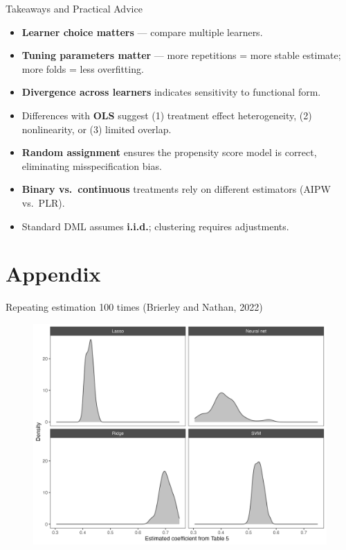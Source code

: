 \documentclass[10pt,table,aspectratio=169]{beamer}
\begin{document}
\begin{frame}[plain, label = two_dimensions]{Takeaways and Practical Advice}

\begin{itemize}
  \item \alert{\bf Learner choice matters} --- compare multiple learners.  \medskip \pause
    \item \alert{\bf Tuning parameters matter} --- more repetitions = more stable estimate; more folds = less overfitting.  \medskip \pause
  \item \alert{\bf Divergence across learners} indicates sensitivity to functional form.   \medskip \pause
  \item Differences with \alert{\bf OLS} suggest (1) \alert{treatment effect heterogeneity}, (2) \alert{nonlinearity}, or (3) \alert{limited overlap}.  \medskip \pause
  \item \alert{\bf Random assignment} ensures the propensity score model is correct, eliminating \alert{misspecification bias}. \medskip \pause
  \item \alert{\bf Binary vs.\ continuous} treatments rely on different estimators (\alert{AIPW} vs.\ \alert{PLR}).  \medskip \pause
  \item Standard DML assumes \alert{\bf i.i.d.}; clustering requires adjustments.  
 
\end{itemize}

\end{frame}



\section{Appendix}

\begin{frame}[plain, label = two_dimensions]{Repeating estimation 100 times (Brierley and Nathan, 2022)}

\begin{figure}[H]
  \centering
  \includegraphics[width=\linewidth]{figures/observational_density_repeat.png}
\end{figure}
\end{frame}
\end{document}
